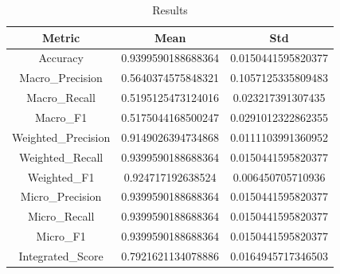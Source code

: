 \begin{table}[htbp]
\centering
\caption{Results}
\label{tab:csv}
\small
\setlength{\tabcolsep}{4pt}
\begin{tabular}{|c|c|c|}
\hline
Metric & Mean & Std \\
\hline
Accuracy & 0.9399590188688364 & 0.0150441595820377 \\
Macro_Precision & 0.5640374575848321 & 0.1057125335809483 \\
Macro_Recall & 0.5195125473124016 & 0.023217391307435 \\
Macro_F1 & 0.5175044168500247 & 0.0291012322862355 \\
Weighted_Precision & 0.9149026394734868 & 0.0111103991360952 \\
Weighted_Recall & 0.9399590188688364 & 0.0150441595820377 \\
Weighted_F1 & 0.924717192638524 & 0.006450705710936 \\
Micro_Precision & 0.9399590188688364 & 0.0150441595820377 \\
Micro_Recall & 0.9399590188688364 & 0.0150441595820377 \\
Micro_F1 & 0.9399590188688364 & 0.0150441595820377 \\
Integrated_Score & 0.7921621134078886 & 0.0164945717346503 \\
\hline
\end{tabular}
\end{table}